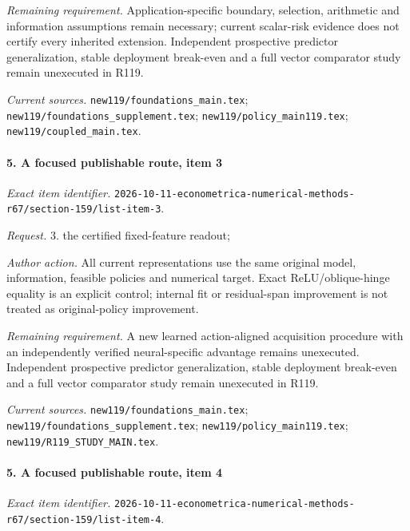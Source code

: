 \par\emph{Remaining requirement.} Application-specific boundary, selection, arithmetic and information assumptions remain necessary; current scalar-risk evidence does not certify every inherited extension. Independent prospective predictor generalization, stable deployment break-even and a full vector comparator study remain unexecuted in R119.

\par\emph{Current sources.} \nolinkurl{new119/foundations_main.tex}; \nolinkurl{new119/foundations_supplement.tex}; \nolinkurl{new119/policy_main119.tex}; \nolinkurl{new119/coupled_main.tex}.

\paragraph{5. A focused publishable route, item 3}

\emph{Exact item identifier.} \nolinkurl{2026-10-11-econometrica-numerical-methods-r67/section-159/list-item-3}.

\par\emph{Request.} 3. the certified fixed-feature readout;

\par\emph{Author action.} All current representations use the same original model, information, feasible policies and numerical target. Exact ReLU/\allowbreak{}oblique-hinge equality is an explicit control; internal fit or residual-span improvement is not treated as original-policy improvement.

\par\emph{Remaining requirement.} A new learned action-aligned acquisition procedure with an independently verified neural-specific advantage remains unexecuted. Independent prospective predictor generalization, stable deployment break-even and a full vector comparator study remain unexecuted in R119.

\par\emph{Current sources.} \nolinkurl{new119/foundations_main.tex}; \nolinkurl{new119/foundations_supplement.tex}; \nolinkurl{new119/policy_main119.tex}; \nolinkurl{new119/R119_STUDY_MAIN.tex}.

\paragraph{5. A focused publishable route, item 4}

\emph{Exact item identifier.} \nolinkurl{2026-10-11-econometrica-numerical-methods-r67/section-159/list-item-4}.

